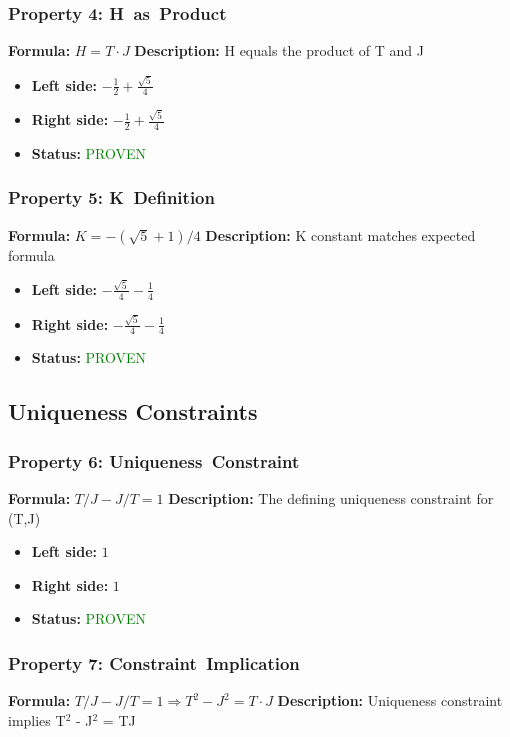 \subsubsection*{Property 4: H~as~Product}
\textbf{Formula:} $H = T \cdot J$
\textbf{Description:} H equals the product of T and J

\begin{itemize}
\item \textbf{Left side:} $- \frac{1}{2} + \frac{\sqrt{5}}{4}$
\item \textbf{Right side:} $- \frac{1}{2} + \frac{\sqrt{5}}{4}$
\item \textbf{Status:} \textcolor{green}{PROVEN}
\end{itemize}

\subsubsection*{Property 5: K~Definition}
\textbf{Formula:} $K = -(\sqrt{5}+1)/4$
\textbf{Description:} K constant matches expected formula

\begin{itemize}
\item \textbf{Left side:} $- \frac{\sqrt{5}}{4} - \frac{1}{4}$
\item \textbf{Right side:} $- \frac{\sqrt{5}}{4} - \frac{1}{4}$
\item \textbf{Status:} \textcolor{green}{PROVEN}
\end{itemize}


\subsection{Uniqueness Constraints}

\subsubsection*{Property 6: Uniqueness~Constraint}
\textbf{Formula:} $T/J - J/T = 1$
\textbf{Description:} The defining uniqueness constraint for (T,J)

\begin{itemize}
\item \textbf{Left side:} $1$
\item \textbf{Right side:} $1$
\item \textbf{Status:} \textcolor{green}{PROVEN}
\end{itemize}

\subsubsection*{Property 7: Constraint~Implication}
\textbf{Formula:} $T/J - J/T = 1  \Rightarrow  T^2 - J^2 = T \cdot J$
\textbf{Description:} Uniqueness constraint implies T$^2$ - J$^2$ = TJ

